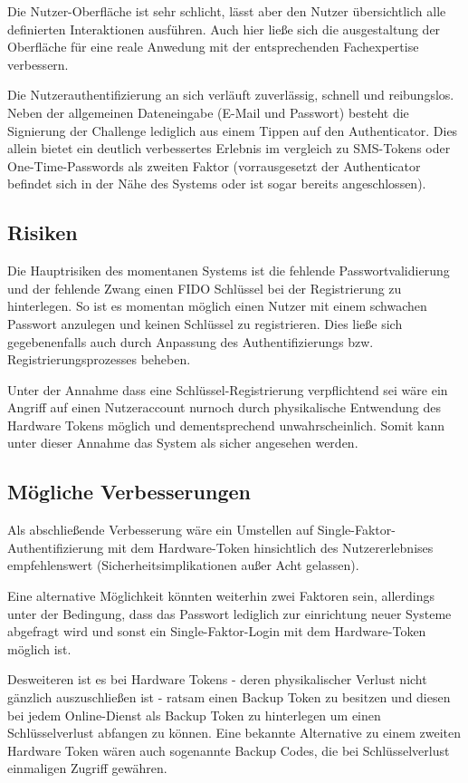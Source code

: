 \documentclass[journal]{IEEEtran}
\begin{document}
Die Nutzer-Oberfläche ist sehr schlicht, lässt aber den Nutzer übersichtlich
alle definierten Interaktionen ausführen. Auch hier ließe sich die
ausgestaltung der Oberfläche für eine reale Anwedung mit der entsprechenden
Fachexpertise verbessern.

Die Nutzerauthentifizierung an sich verläuft zuverlässig, schnell und
reibungslos. Neben der allgemeinen Dateneingabe (E-Mail und Passwort) besteht
die Signierung der Challenge lediglich aus einem Tippen auf den Authenticator.
Dies allein bietet ein deutlich verbessertes Erlebnis im vergleich zu
SMS-Tokens oder One-Time-Passwords als zweiten Faktor (vorrausgesetzt der
Authenticator befindet sich in der Nähe des Systems oder ist sogar bereits
angeschlossen).

\subsection{Risiken}

Die Hauptrisiken des momentanen Systems ist die fehlende Passwortvalidierung
und der fehlende Zwang einen FIDO Schlüssel bei der Registrierung zu
hinterlegen. So ist es momentan möglich einen Nutzer mit einem schwachen
Passwort anzulegen und keinen Schlüssel zu registrieren. Dies ließe sich
gegebenenfalls auch durch Anpassung des Authentifizierungs bzw.
Registrierungsprozesses beheben.

Unter der Annahme dass eine Schlüssel-Registrierung verpflichtend sei wäre ein
Angriff auf einen Nutzeraccount nurnoch durch physikalische Entwendung des
Hardware Tokens möglich und dementsprechend unwahrscheinlich. Somit kann unter
dieser Annahme das System als sicher angesehen werden.

\subsection{Mögliche Verbesserungen}

Als abschließende Verbesserung wäre ein Umstellen auf
Single-Faktor-Authentifizierung mit dem Hardware-Token hinsichtlich des
Nutzererlebnises empfehlenswert (Sicherheitsimplikationen außer Acht gelassen). 

Eine alternative Möglichkeit könnten weiterhin zwei Faktoren sein, allerdings
unter der Bedingung, dass das Passwort lediglich zur einrichtung neuer Systeme
abgefragt wird und sonst ein Single-Faktor-Login mit dem Hardware-Token möglich
ist.

Desweiteren ist es bei Hardware Tokens - deren physikalischer Verlust nicht
gänzlich auszuschließen ist - ratsam einen Backup Token zu besitzen und diesen
bei jedem Online-Dienst als Backup Token zu hinterlegen um einen
Schlüsselverlust abfangen zu können. Eine bekannte Alternative zu einem zweiten
Hardware Token wären auch sogenannte Backup Codes, die bei Schlüsselverlust
einmaligen Zugriff gewähren.
\end{document}
